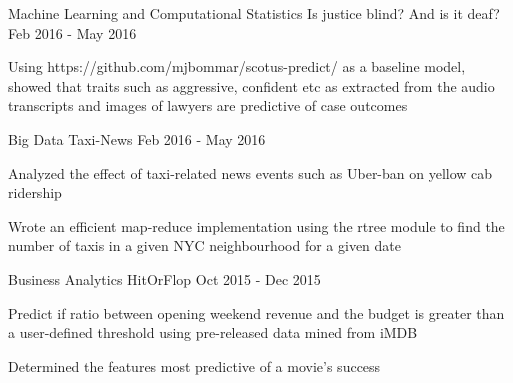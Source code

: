 \begin{cventries}
  \cventry
    {Machine Learning and Computational Statistics}
    {Is justice blind? And is it deaf?}
    {}
    {Feb 2016 - May 2016}
    {
      \begin{cvitems}
        \item {Using https://github.com/mjbommar/scotus-predict/ as a baseline model, showed that traits such as aggressive, confident etc as extracted from the audio transcripts and images of lawyers are predictive of case outcomes}
      \end{cvitems}
    }
  \cventry
    {Big Data}
    {Taxi-News}
    {}
    {Feb 2016 - May 2016}
    {
      \begin{cvitems}
        \item {Analyzed the effect of taxi-related news events such as Uber-ban on yellow cab ridership}
        \item {Wrote an efficient map-reduce implementation using the rtree module to find the number of taxis in a given NYC neighbourhood for a given date}
      \end{cvitems}
    }
  \cventry
    {Business Analytics}
    {HitOrFlop}
    {}
    {Oct 2015 - Dec 2015}
    {
      \begin{cvitems}
        \item {Predict if ratio between opening weekend revenue and the budget is greater than a user-defined threshold using pre-released data mined from iMDB}
        \item {Determined the features most predictive of a movie's success}
      \end{cvitems}
    }
\end{cventries}
